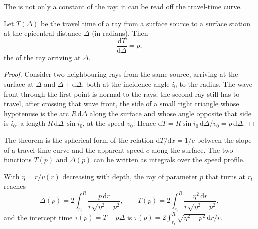 \begin{omfigure}
\par{}
\label{fig:b3:seismology-imaging:shells}
\end{omfigure}

The  is not only a constant of the ray: it can be read off the
travel-time curve.

\begin{theorem}\label{thm:b3:seismology-imaging:benndorf}
Let $T(\Delta)$ be the travel time of a ray from a surface source to a surface
station at the epicentral distance $\Delta$ (in radians). Then
\[
  \frac{\mathrm dT}{\mathrm d\Delta} = p ,
\]
the  of the ray arriving at $\Delta$.
\end{theorem}

\begin{proof}
Consider two neighbouring rays from the same source, arriving at the surface
at $\Delta$ and $\Delta + \mathrm d\Delta$, both at the incidence angle $i_0$
to the radius. The wave front through the first point is normal to the rays;
the second ray still has to travel, after crossing that wave front, the side of
a small right triangle whose hypotenuse is the arc $R\,\mathrm d\Delta$ along
the surface and whose angle opposite that side is $i_0$: a length
$R\,\mathrm d\Delta\,\sin i_0$, at the speed $v_0$. Hence
$\mathrm dT = R\sin i_0\,\mathrm d\Delta/v_0 = p\,\mathrm d\Delta$.
\end{proof}

The theorem is the spherical form of the relation $\mathrm dT/\mathrm dx = 1/c$
between the slope of a travel-time curve and the apparent speed $c$ along the
surface. The two functions $T(p)$ and $\Delta(p)$ can be written as integrals
over the speed profile.

\begin{proposition}\label{prop:b3:seismology-imaging:integrals}
With $\eta = r/v(r)$ decreasing with depth, the ray of parameter $p$ that turns
at $r_t$ reaches
\[
  \Delta(p) = 2\int_{r_t}^{R}\frac{p\,\mathrm dr}{r\sqrt{\eta^2 - p^2}},
  \qquad
  T(p) = 2\int_{r_t}^{R}\frac{\eta^2\,\mathrm dr}{r\sqrt{\eta^2 - p^2}},
\]
and the intercept time $\tau(p) = T - p\Delta$ is
$\tau(p) = 2\int_{r_t}^{R}\sqrt{\eta^2 - p^2}\,\mathrm dr/r$.
\end{proposition}

